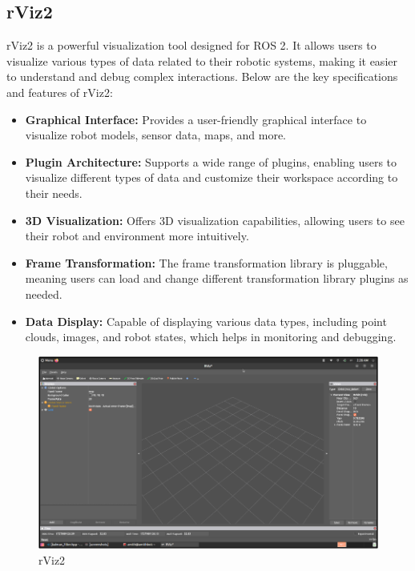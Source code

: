 \subsection{\fontsize{14}{16} rViz2}
{
	\fontsize{12}{14}
	rViz2 is a powerful visualization tool designed for ROS 2. It allows users to visualize various
	types of data related to their robotic systems, making it easier to understand and debug complex
	interactions. Below are the key specifications and features of rViz2:
	\begin{itemize}
		\item \textbf{Graphical Interface:} Provides a user-friendly graphical interface to visualize robot
		models, sensor data, maps, and more.
		\item \textbf{Plugin Architecture:} Supports a wide range of plugins, enabling users to visualize
		different types of data and customize their workspace according to their needs.
		\item \textbf{3D Visualization:} Offers 3D visualization capabilities, allowing users to see their robot
		and environment more intuitively.
		\item \textbf{Frame Transformation:} The frame transformation library is pluggable, meaning users
		can load and change different transformation library plugins as needed.
		\item \textbf{Data Display:} Capable of displaying various data types, including point clouds,
		images, and robot states, which helps in monitoring and debugging.
	\end{itemize}
	
	\begin{figure}[H]
		\centering
		\includegraphics{images/Content/rviz2}
		\caption{rViz2}
		\label{fig:rviz2}
	\end{figure}
}

